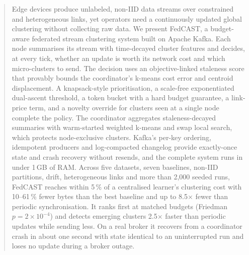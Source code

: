 \begin{abstract}
Edge devices produce unlabeled, non-IID data streams over constrained and heterogeneous links, yet operators need a continuously updated global clustering without collecting raw data. We present FedCAST, a budget-aware federated stream clustering system built on Apache Kafka. Each node summarises its stream with time-decayed cluster features and decides, at every tick, whether an update is worth its network cost and which micro-clusters to send. The decision uses an objective-linked staleness score that provably bounds the coordinator's k-means cost error and centroid displacement. A knapsack-style prioritisation, a scale-free exponentiated dual-ascent threshold, a token bucket with a hard budget guarantee, a link-price term, and a novelty override for clusters seen at a single node complete the policy. The coordinator aggregates staleness-decayed summaries with warm-started weighted k-means and swap local search, which protects node-exclusive clusters. Kafka's per-key ordering, idempotent producers and log-compacted changelog provide exactly-once state and crash recovery without resends, and the complete system runs in under 1\,GB of RAM. Across five datasets, seven baselines, non-IID partitions, drift, heterogeneous links and more than 2{,}000 seeded runs, FedCAST reaches within 5\,\% of a centralised learner's clustering cost with 10--61\,\% fewer bytes than the best baseline and up to 8.5$\times$ fewer than periodic synchronisation. It ranks first at matched budgets (Friedman $p{=}2{\times}10^{-4}$) and detects emerging clusters 2.5$\times$ faster than periodic updates while sending less. On a real broker it recovers from a coordinator crash in about one second with state identical to an uninterrupted run and loses no update during a broker outage.
\end{abstract}
